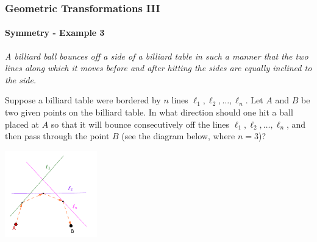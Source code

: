 \documentclass[8pt,xcolor=table,dvipsnames]{beamer}
\begin{document}
\begin{frame}[t]
    \frametitle{Geometric Transformations III}
    \framesubtitle{Symmetry - Example 3}
    \begin{example}
        \textit{A billiard ball bounces off a side of a billiard table in such a manner that the two lines along
        which it moves before and after hitting the sides are equally inclined to the side.}

        Suppose a billiard table were bordered by $n$ lines $\ell_1, \ell_2, \ldots, \ell_n$.
        Let $A$ and $B$ be two given points on the billiard table.
        In what direction should one hit a ball placed at $A$
        so that it will bounce consecutively off the lines $\ell_1, \ell_2, \ldots, \ell_n$,
        and then pass through the point $B$ (see the diagram below, where $n = 3$)?
    \end{example}

    \begin{center}
        \includegraphics[width=4cm]{./svg/pdf/symmetry-3a.pdf}
    \end{center}
\end{frame}
\end{document}
